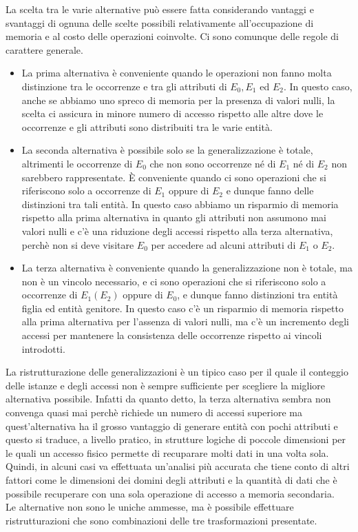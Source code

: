 \documentclass[12pt]{report}
\begin{document}
		La scelta tra le varie alternative può essere fatta considerando vantaggi e svantaggi di ognuna delle scelte possibili relativamente all'occupazione di memoria e al costo delle operazioni coinvolte. Ci sono comunque delle regole di carattere generale.
		\begin{itemize}
			\item La prima alternativa è conveniente quando le operazioni non fanno molta distinzione tra le occorrenze e tra gli attributi di $E_0, E_1$ ed $E_2$. In questo caso, anche se abbiamo uno spreco di memoria per la presenza di valori nulli, la scelta ci assicura in minore numero di accesso rispetto alle altre dove le occorrenze e gli attributi sono distribuiti tra le varie entità.
			\item La seconda alternativa è possibile solo se la generalizzazione è totale, altrimenti le occorrenze di $E_0$ che non sono occorrenze né di $E_1$ né di $E_2$ non sarebbero rappresentate. È conveniente quando ci sono operazioni che si riferiscono solo a occorrenze di $E_1$ oppure di $E_2$ e dunque fanno delle distinzioni tra tali entità. In questo caso abbiamo un risparmio di memoria rispetto alla prima alternativa in quanto gli attributi non assumono mai valori nulli e c'è una riduzione degli accessi rispetto alla terza alternativa, perchè non si deve visitare $E_0$ per accedere ad alcuni attributi di $E_1$ o $E_2$.
			\item La terza alternativa è conveniente quando la generalizzazione non è totale, ma non è un vincolo necessario, e ci sono operazioni che si riferiscono solo a occorrenze di $E_{1}\left(E_{2}\right)$ oppure di $E_0$, e dunque fanno distinzioni tra entità figlia ed entità genitore. In questo caso c'è un risparmio di memoria rispetto alla prima alternativa per l'assenza di valori nulli, ma c'è un incremento degli accessi per mantenere la consistenza delle occorrenze rispetto ai vincoli introdotti.
		\end{itemize}
		La ristrutturazione delle generalizzazioni è un tipico caso per il quale il conteggio delle istanze e degli accessi non è sempre sufficiente per scegliere la migliore alternativa possibile. Infatti da quanto detto, la terza alternativa sembra non convenga quasi mai perchè richiede un numero di accessi superiore ma quest'alternativa ha il grosso vantaggio di generare entità con pochi attributi e questo si traduce, a livello pratico, in strutture logiche di poccole dimensioni per le quali un accesso fisico permette di recuparare molti dati in una volta sola. Quindi, in alcuni casi va effettuata un'analisi più accurata che tiene conto di altri fattori come le dimensioni dei domini degli attributi e la quantità di dati che è possibile recuperare con una sola operazione di accesso a memoria secondaria. \\
		Le alternative non sono le uniche ammesse, ma è possibile effettuare ristrutturazioni che sono combinazioni delle tre trasformazioni presentate.
\end{document}
